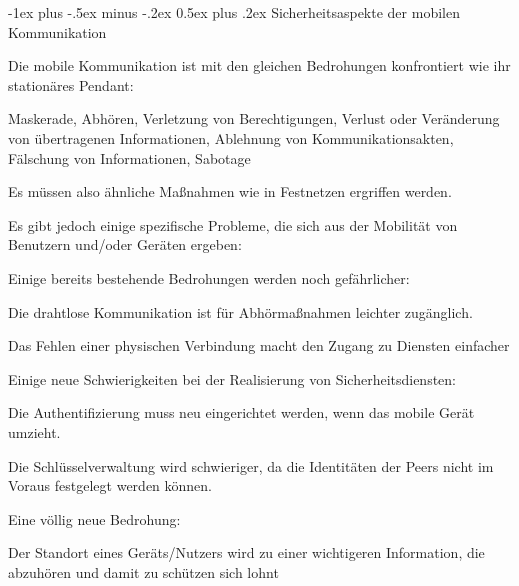 \documentclass[a4paper]{article}
\makeatletter
\renewcommand{\section}{\@startsection{section}{1}{0mm}%
 {-1ex plus -.5ex minus -.2ex}%
 {0.5ex plus .2ex}%
 {\normalfont\large\bfseries}}
\makeatother
\begin{document}
\begin{multicols}{3}
\begin{itemize*}
            \section{Sicherheitsaspekte der mobilen
              Kommunikation}
            \begin{itemize*}
                  \item Die mobile Kommunikation ist mit den gleichen Bedrohungen konfrontiert
                  wie ihr stationäres Pendant:
                  \begin{itemize*}
                        \item Maskerade, Abhören, Verletzung von Berechtigungen, Verlust oder Veränderung von übertragenen Informationen, Ablehnung von Kommunikationsakten, Fälschung von Informationen, Sabotage
                        \item Es müssen also ähnliche Maßnahmen wie in Festnetzen ergriffen werden.
                  \end{itemize*}
                  \item Es gibt jedoch einige spezifische Probleme, die sich aus der Mobilität
                  von Benutzern und/oder Geräten ergeben:
                  \begin{itemize*}
                        \item Einige bereits bestehende Bedrohungen werden noch gefährlicher:
                        \begin{itemize*} \item Die drahtlose Kommunikation ist für Abhörmaßnahmen leichter zugänglich. \item Das Fehlen einer physischen Verbindung macht den Zugang zu Diensten einfacher \end{itemize*}
                        \item Einige neue Schwierigkeiten bei der Realisierung von Sicherheitsdiensten:
                        \begin{itemize*} \item Die Authentifizierung muss neu eingerichtet werden, wenn das mobile Gerät umzieht. \item Die Schlüsselverwaltung wird schwieriger, da die Identitäten der Peers nicht im Voraus festgelegt werden können. \end{itemize*}
                        \item Eine völlig neue Bedrohung:
                        \begin{itemize*} \item Der Standort eines Geräts/Nutzers wird zu einer wichtigeren Information, die abzuhören und damit zu schützen sich lohnt \end{itemize*}
                  \end{itemize*}
            \end{itemize*}


\end{itemize*}
\end{multicols}
\end{document}
